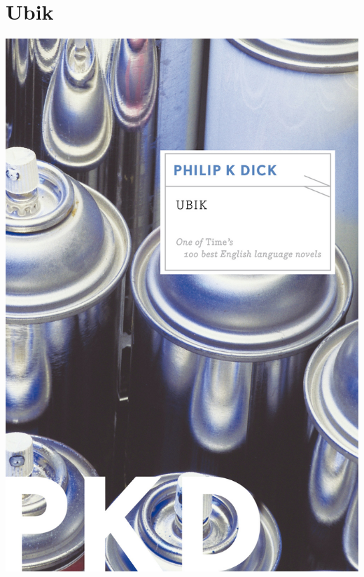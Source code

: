 \documentclass{tufte-handout}
\makeatletter
\newcommand{\varcaption}[2][0pt]{%
  \gsetlength{\@tufte@caption@vertical@offset}{-#1}%
  \gdef\@tufte@stored@varcaption{#2}%
}
\gdef\@tufte@stored@varcaption{} %
\makeatother
\begin{document}
\section*{Ubik}
\begin{marginfigure}[20\baselineskip]
   \includegraphics[width=\linewidth]{images/ubik.jpg}
   \varcaption{\href{https://www.hmhbooks.com/shop/books/Ubik/9780547572291}{Publisher Link}, \href{https://www.amazon.com/Ubik-Philip-K-Dick/dp/0547572298}{Amazon Link}}
\end{marginfigure}
\end{document}
